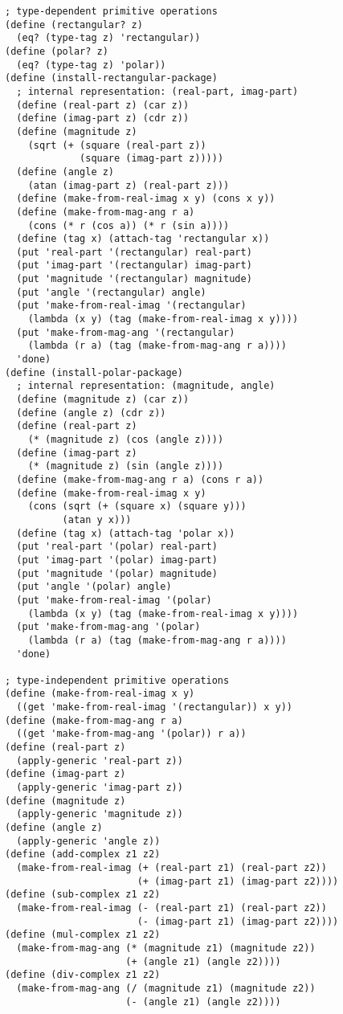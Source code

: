 \documentclass[../main.tex]{subfiles}
\begin{document}
\begin{lstlisting}
; type-dependent primitive operations
(define (rectangular? z)
  (eq? (type-tag z) 'rectangular))
(define (polar? z)
  (eq? (type-tag z) 'polar))
(define (install-rectangular-package)
  ; internal representation: (real-part, imag-part)
  (define (real-part z) (car z))
  (define (imag-part z) (cdr z))
  (define (magnitude z)
    (sqrt (+ (square (real-part z))
             (square (imag-part z)))))
  (define (angle z)
    (atan (imag-part z) (real-part z)))
  (define (make-from-real-imag x y) (cons x y))
  (define (make-from-mag-ang r a)
    (cons (* r (cos a)) (* r (sin a))))
  (define (tag x) (attach-tag 'rectangular x))
  (put 'real-part '(rectangular) real-part)
  (put 'imag-part '(rectangular) imag-part)
  (put 'magnitude '(rectangular) magnitude)
  (put 'angle '(rectangular) angle)
  (put 'make-from-real-imag '(rectangular)
    (lambda (x y) (tag (make-from-real-imag x y))))
  (put 'make-from-mag-ang '(rectangular)
    (lambda (r a) (tag (make-from-mag-ang r a))))
  'done)
(define (install-polar-package)
  ; internal representation: (magnitude, angle)
  (define (magnitude z) (car z))
  (define (angle z) (cdr z))
  (define (real-part z)
    (* (magnitude z) (cos (angle z))))
  (define (imag-part z)
    (* (magnitude z) (sin (angle z))))
  (define (make-from-mag-ang r a) (cons r a))
  (define (make-from-real-imag x y)
    (cons (sqrt (+ (square x) (square y)))
          (atan y x)))
  (define (tag x) (attach-tag 'polar x))
  (put 'real-part '(polar) real-part)
  (put 'imag-part '(polar) imag-part)
  (put 'magnitude '(polar) magnitude)
  (put 'angle '(polar) angle)
  (put 'make-from-real-imag '(polar)
    (lambda (x y) (tag (make-from-real-imag x y))))
  (put 'make-from-mag-ang '(polar)
    (lambda (r a) (tag (make-from-mag-ang r a))))
  'done)

; type-independent primitive operations
(define (make-from-real-imag x y)
  ((get 'make-from-real-imag '(rectangular)) x y))
(define (make-from-mag-ang r a)
  ((get 'make-from-mag-ang '(polar)) r a))
(define (real-part z)
  (apply-generic 'real-part z))
(define (imag-part z)
  (apply-generic 'imag-part z))
(define (magnitude z)
  (apply-generic 'magnitude z))
(define (angle z)
  (apply-generic 'angle z))
(define (add-complex z1 z2)
  (make-from-real-imag (+ (real-part z1) (real-part z2))
                       (+ (imag-part z1) (imag-part z2))))
(define (sub-complex z1 z2)
  (make-from-real-imag (- (real-part z1) (real-part z2))
                       (- (imag-part z1) (imag-part z2))))
(define (mul-complex z1 z2)
  (make-from-mag-ang (* (magnitude z1) (magnitude z2))
                     (+ (angle z1) (angle z2))))
(define (div-complex z1 z2)
  (make-from-mag-ang (/ (magnitude z1) (magnitude z2))
                     (- (angle z1) (angle z2))))
\end{lstlisting}
\end{document}
